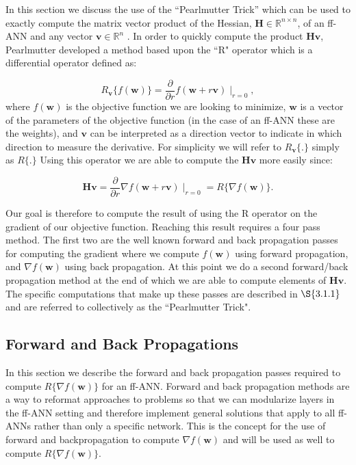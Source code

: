 \documentclass[letterpaper,12pt,titlepage,oneside,final]{book}
\begin{document}
	In this section we discuss the use of the ``Pearlmutter Trick'' which can be used to exactly compute the matrix vector product of the Hessian, $\mathbf{H} \in \mathbb{R}^{n\times n}$, of an ff-ANN and any vector $\mathbf{v} \in \mathbb{R}^{n}$ \cite{Pearlmutter.1993}. In order to quickly compute the product $\mathbf{Hv}$, Pearlmutter developed a method based upon the ``R" operator which is a differential operator \cite{Pearlmutter.1993} defined as:
	
	\begin{equation}
	R_{\mathbf{v}}\{f(\mathbf{w})\} = \frac{\partial}{\partial r}f(\mathbf{w} + r\mathbf{v})\mid_{r=0} ,
	\end{equation}
	where $f(\mathbf{w})$ is the objective function we are looking to minimize, $\mathbf{w}$ is a vector of the parameters of the objective function (in the case of an ff-ANN these are the weights), and $\mathbf{v}$ can be interpreted as a direction vector to indicate in which direction to measure the derivative. For simplicity we will refer to $R_{\mathbf{v}}\{.\}$ simply as $R\{.\}$ Using this operator we are able to compute the $\mathbf{Hv}$ more easily since:
	
	\begin{equation}
	\mathbf{Hv} = \frac{\partial}{\partial r}\nabla{f}(\mathbf{w} + r\mathbf{v})\mid_{r=0} = R\{\nabla{f(\mathbf{w})}\}.
	\end{equation}
	
	Our goal is therefore to compute the result of using the R operator on the gradient of our objective function. Reaching this result requires a four pass method. The first two are the well known forward and back propagation passes for computing the gradient where we compute $f(\mathbf{w})$ using forward propagation, and $\nabla{f(\mathbf{w})}$ using back propagation. At this point we do a second forward/back propagation method at the end of which we are able to compute elements of $\mathbf{Hv}$.  The specific computations that make up these passes are described in $\S{3.1.1}$ and are referred to collectively as the ``Pearlmutter Trick".  
	
	\subsection{Forward and Back Propagations}
	\label{appendix:forandback}
	
	In this section we describe the forward and back propagation passes required to compute $R\{\nabla{f(\mathbf{w})}\}$ for an ff-ANN. Forward and back propagation methods are a way to reformat approaches to problems so that we can modularize layers in the ff-ANN setting and therefore implement general solutions that apply to all ff-ANNs rather than only a specific network. This is the concept for the use of forward and backpropagation to compute $\nabla{f(\mathbf{w})}$ and will be used as well to compute $R\{\nabla{f(\mathbf{w})}\}$.
	
\end{document}
